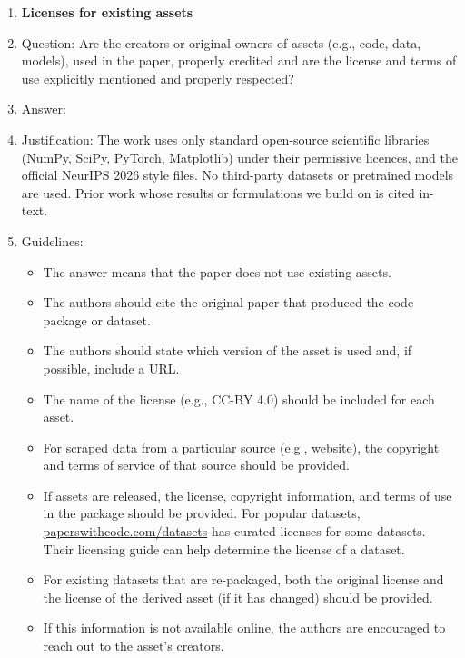 \begin{enumerate}
\item {\bf Licenses for existing assets}
    \item[] Question: Are the creators or original owners of assets (e.g., code, data, models), used in the paper, properly credited and are the license and terms of use explicitly mentioned and properly respected?
    \item[] Answer: \answerYes{} %
    \item[] Justification: The work uses only standard open-source scientific libraries (NumPy, SciPy, PyTorch, Matplotlib) under their permissive licences, and the official NeurIPS 2026 style files. No third-party datasets or pretrained models are used. Prior work whose results or formulations we build on is cited in-text.
    \item[] Guidelines:
    \begin{itemize}
        \item The answer \answerNA{} means that the paper does not use existing assets.
        \item The authors should cite the original paper that produced the code package or dataset.
        \item The authors should state which version of the asset is used and, if possible, include a URL.
        \item The name of the license (e.g., CC-BY 4.0) should be included for each asset.
        \item For scraped data from a particular source (e.g., website), the copyright and terms of service of that source should be provided.
        \item If assets are released, the license, copyright information, and terms of use in the package should be provided. For popular datasets, \url{paperswithcode.com/datasets} has curated licenses for some datasets. Their licensing guide can help determine the license of a dataset.
        \item For existing datasets that are re-packaged, both the original license and the license of the derived asset (if it has changed) should be provided.
        \item If this information is not available online, the authors are encouraged to reach out to the asset's creators.
    \end{itemize}


\end{enumerate}
